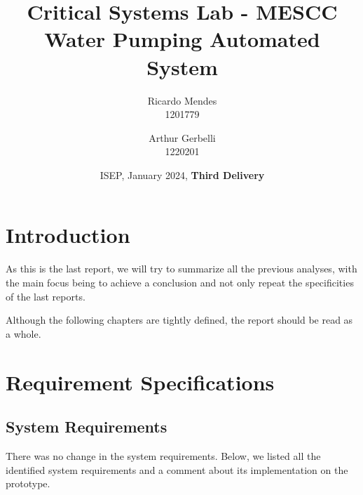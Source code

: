 \documentclass[11pt]{article}
\title{\textbf{Critical Systems Lab - MESCC\\ Water Pumping Automated System}}
\date{ISEP, January 2024, \textbf{Third Delivery}}
\author{Ricardo Mendes\\ 1201779
\and Arthur Gerbelli\\ 1220201}
\begin{document}
\maketitle              
\newpage
\tableofcontents
\newpage

%
\section{Introduction}

As this is the last report, we will try to summarize all the previous analyses, with the main focus being to achieve a conclusion and not only repeat the specificities of the last reports. 

Although the following chapters are tightly defined, the report should be read as a whole. 

\section{Requirement Specifications}

\subsection{System Requirements}

There was no change in the system requirements. Below, we listed all the identified system requirements and a comment about its implementation on the prototype. 
\end{document}
